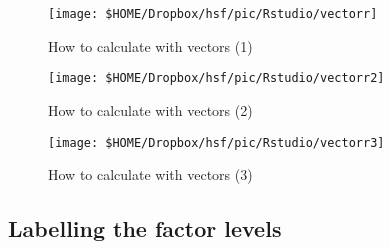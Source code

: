 \begin{figure}
	\begin{center}
		\texttt{[image: \$HOME/Dropbox/hsf/pic/Rstudio/vectorr]}
		\caption{How to calculate with vectors (1)}\label{fig:vectorr}
		\end{center}
\end{figure}	
\begin{figure}
			\begin{center}
				\texttt{[image: \$HOME/Dropbox/hsf/pic/Rstudio/vectorr2]}
				\caption{How to calculate with vectors (2)}\label{fig:vectorr2}
				\end{center}
\end{figure}	
\begin{figure}
					\begin{center}
						\texttt{[image: \$HOME/Dropbox/hsf/pic/Rstudio/vectorr3]}
						\caption{How to calculate with vectors (3)}\label{fig:vectorr3}
						\end{center}
\end{figure}
						




\subsection{Labelling the factor levels}

